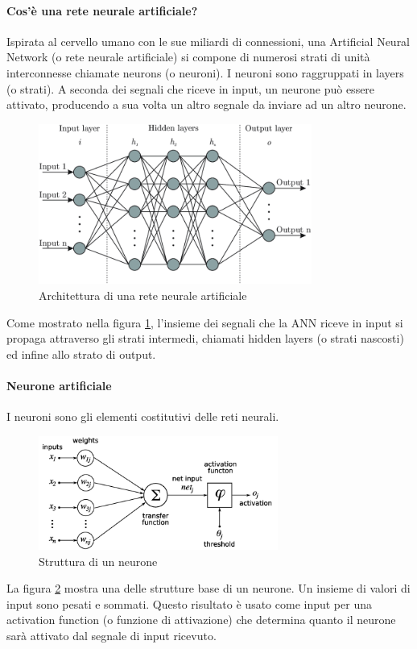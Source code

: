         \paragraph{Cos'è una rete neurale artificiale?}
        Ispirata al cervello umano con le sue miliardi di connessioni, una Artificial Neural Network (o rete neurale artificiale) si compone di numerosi strati di unità interconnesse chiamate neurons (o neuroni). I neuroni sono raggruppati in layers (o strati). A seconda dei segnali che riceve in input, un neurone può essere attivato, producendo a sua volta un altro segnale da inviare ad un altro neurone. 
            \begin{figure}[!h]
                \centering
                \includegraphics[width=0.8\textwidth]{Images/NN/ANN.png}
                \caption{Architettura di una rete neurale artificiale}
                \label{ANN architecture}
            \end{figure}
        
        Come mostrato nella figura \ref{ANN architecture}, l'insieme dei segnali che la ANN riceve in input si propaga attraverso gli strati intermedi, chiamati hidden layers (o strati nascosti) ed infine allo strato di output.

        \paragraph{Neurone artificiale}
        I neuroni sono gli elementi costitutivi delle reti neurali.
            \begin{figure}
                \centering
                \includegraphics[width=0.7\textwidth]{Images/NN/Neuron.png}
                \caption{Struttura di un neurone}
                \label{Neuron}
            \end{figure}
        La figura \ref{Neuron} mostra una delle strutture base di un neurone. Un insieme di valori di input sono pesati e sommati. Questo risultato è usato come input per una activation function (o funzione di attivazione) che determina quanto il neurone sarà attivato dal segnale di input ricevuto.
        
